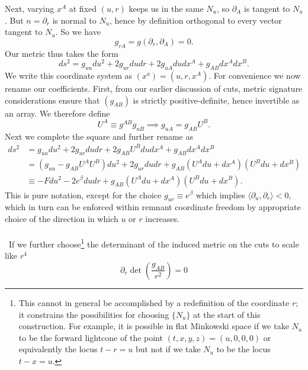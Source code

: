 \documentclass[11pt,letterpaper]{article}
\newcommand{\LP}{\left(}
\newcommand{\RP}{\right)}
\newcommand{\D}{\partial}
\begin{document}
Next, varying $x^A$ at fixed $(u,r)$ keeps us in the same $N_u$, so $\D_A$ is tangent to $N_u$. But $n = \D_r$ is normal to $N_u$, hence by definition orthogonal to every vector tangent to $N_u$. So we have \begin{equation}
g_{rA} = g(\D_r, \D_A) = 0.
\end{equation}
Our metric thus takes the form \begin{equation}
ds^2 = g_{uu} du^2 + 2 g_{ur} du dr + 2 g_{uA} du dx^A + g_{AB} dx^A dx^B.
\end{equation}
We write this coordinate system as $(x^a) = (u, r, x^A)$. For convenience we now rename our coefficients. First, from our earlier discussion of cuts, metric signature considerations ensure that $(g_{AB})$ is strictly positive-definite, hence invertible as an array. We therefore define \begin{equation}
U^A \equiv g^{AB} g_{uB} \implies g_{uA} = g_{AB} U^B.
\end{equation}
Next we complete the square and further rename as \begin{equation}\label{bondigauge}
\begin{aligned}
ds^2 & = g_{uu} du^2 + 2 g_{ur} du dr + 2 g_{AB} U^B du dx^A + g_{AB} dx^A dx^B \\
& = \LP g_{uu}- g_{AB} U^A U^B \RP du^2 + 2 g_{ur} du dr + g_{AB} \LP U^A du + dx^A \RP \LP U^B du + dx^B \RP \\
& \equiv - F du^2 - 2 e^\beta du dr + g_{AB} \LP U^A du + dx^A \RP \LP U^B du + dx^B \RP.
\end{aligned}
\end{equation}
This is pure notation, except for the choice $g_{ur} \equiv e^\beta$ which implies $\langle \D_u, \D_r \rangle < 0$, which in turn can be enforced within remnant coordinate freedom by appropriate choice of the direction in which $u$ or $r$ increases.\\
\\
\
If we further choose\footnote{This cannot in general be accomplished by a redefinition of the coordinate $r$; it constrains the possibilities for choosing $\{N_u\}$ at the start of this construction. For example, it is possible in flat Minkowski space if we take $N_u$ to be the forward lightcone of the point $(t,x,y,z) = (u,0,0,0)$ or equivalently the locus $t - r = u$ but not if we take $N_u$ to be the locus $t - x = u$.} the determinant of the induced metric on the cuts to scale like $r^4$ \begin{equation}\label{luminositydistance}
\D_r \det \LP \frac{g_{AB}}{r^2} \RP = 0
\end{equation}
\end{document}
